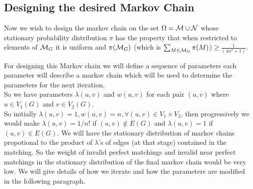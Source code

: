 \subsection{Designing the desired Markov Chain}
Now we wish to design the markov chain on the set $\Omega=\mathcal{M} \cup \mathcal{N}$ whose stationary probability distribution $\pi$ has the property that when restricted to elements of $\mathcal{M}_G$ it is uniform and $\pi(\mathcal{M}_G) $ (which is $\sum_{M\in \mathcal{M}_G} \pi(M)$)$\geq \frac{1}{(4n^2+1)}$.\\
\begin{flushleft}
	For designing this Markov chain we will define a sequence of parameters each parameter will describe a markov chain which will be used to determine the parameters for the next iteration.\\
	So we have parameters $\lambda(u,v)$ and $w(u,v)$ for each pair $(u,v) $ where $u\in V_1(G)$ and $v \in V_2(G)$. 
	\\
	So initially $\lambda(u,v)=1, w(u,v)=n ,\forall (u,v) \in V_1 \times V_2 $, then progressively we would make $\lambda(u,v)=1/n!$ if $(u,v)\notin E(G)$ and $\lambda(u,v)=1$ if $(u,v) \in E(G)$. We will have the stationary distribution of markov chains propotional to the product of $\lambda$'s of edges (at that stage) contained in the matching. So the weight of invalid perfect matchings and invalid near perfect matchings in the stationary distribution of the final markov chain would be very low. We will give details of how we iterate and how the parameters are modified in the following paragraph.
\end{flushleft}
